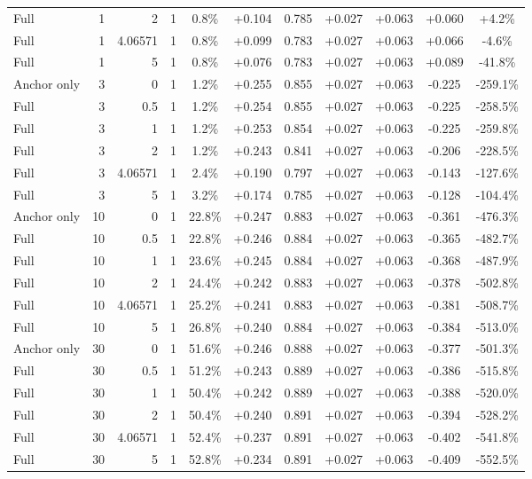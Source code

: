 \begin{table}[htbp]
\begin{tabular}{lrrrccccccc}
Full & 1 & 2 & 1 & 0.8\% & +0.104 & 0.785 & +0.027 & +0.063 & +0.060 & +4.2\% \\
Full & 1 & 4.06571 & 1 & 0.8\% & +0.099 & 0.783 & +0.027 & +0.063 & +0.066 & -4.6\% \\
Full & 1 & 5 & 1 & 0.8\% & +0.076 & 0.783 & +0.027 & +0.063 & +0.089 & -41.8\% \\
Anchor only & 3 & 0 & 1 & 1.2\% & +0.255 & 0.855 & +0.027 & +0.063 & -0.225 & -259.1\% \\
Full & 3 & 0.5 & 1 & 1.2\% & +0.254 & 0.855 & +0.027 & +0.063 & -0.225 & -258.5\% \\
Full & 3 & 1 & 1 & 1.2\% & +0.253 & 0.854 & +0.027 & +0.063 & -0.225 & -259.8\% \\
Full & 3 & 2 & 1 & 1.2\% & +0.243 & 0.841 & +0.027 & +0.063 & -0.206 & -228.5\% \\
Full & 3 & 4.06571 & 1 & 2.4\% & +0.190 & 0.797 & +0.027 & +0.063 & -0.143 & -127.6\% \\
Full & 3 & 5 & 1 & 3.2\% & +0.174 & 0.785 & +0.027 & +0.063 & -0.128 & -104.4\% \\
Anchor only & 10 & 0 & 1 & 22.8\% & +0.247 & 0.883 & +0.027 & +0.063 & -0.361 & -476.3\% \\
Full & 10 & 0.5 & 1 & 22.8\% & +0.246 & 0.884 & +0.027 & +0.063 & -0.365 & -482.7\% \\
Full & 10 & 1 & 1 & 23.6\% & +0.245 & 0.884 & +0.027 & +0.063 & -0.368 & -487.9\% \\
Full & 10 & 2 & 1 & 24.4\% & +0.242 & 0.883 & +0.027 & +0.063 & -0.378 & -502.8\% \\
Full & 10 & 4.06571 & 1 & 25.2\% & +0.241 & 0.883 & +0.027 & +0.063 & -0.381 & -508.7\% \\
Full & 10 & 5 & 1 & 26.8\% & +0.240 & 0.884 & +0.027 & +0.063 & -0.384 & -513.0\% \\
Anchor only & 30 & 0 & 1 & 51.6\% & +0.246 & 0.888 & +0.027 & +0.063 & -0.377 & -501.3\% \\
Full & 30 & 0.5 & 1 & 51.2\% & +0.243 & 0.889 & +0.027 & +0.063 & -0.386 & -515.8\% \\
Full & 30 & 1 & 1 & 50.4\% & +0.242 & 0.889 & +0.027 & +0.063 & -0.388 & -520.0\% \\
Full & 30 & 2 & 1 & 50.4\% & +0.240 & 0.891 & +0.027 & +0.063 & -0.394 & -528.2\% \\
Full & 30 & 4.06571 & 1 & 52.4\% & +0.237 & 0.891 & +0.027 & +0.063 & -0.402 & -541.8\% \\
Full & 30 & 5 & 1 & 52.8\% & +0.234 & 0.891 & +0.027 & +0.063 & -0.409 & -552.5\% \\

\end{tabular}
\end{table}
